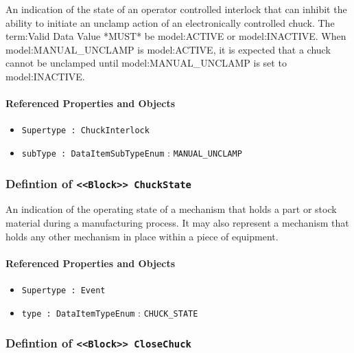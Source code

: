 \FloatBarrier

An indication of the state of an operator controlled interlock that can inhibit the ability to initiate an unclamp action of an electronically controlled chuck.
 The {term:Valid Data Value} *MUST* be {model:ACTIVE} or {model:INACTIVE}. 
 When {model:MANUAL_UNCLAMP} is {model:ACTIVE}, it is expected that a chuck cannot be unclamped until {model:MANUAL_UNCLAMP} is set to {model:INACTIVE}. 

\FloatBarrier
\paragraph{Referenced Properties and Objects}

\begin{itemize}
\item \texttt{Supertype : ChuckInterlock}

\item \texttt{subType : DataItemSubTypeEnum} : \texttt{MANUAL_UNCLAMP}

\end{itemize}
\FloatBarrier
\subsubsection{Defintion of \texttt{<<Block>> ChuckState}}
  \label{type:ChuckState}

\FloatBarrier

An indication of the operating state of a mechanism that holds a part or stock material during a manufacturing process. It may also represent a mechanism that holds any other mechanism in place within a piece of equipment.

\FloatBarrier
\paragraph{Referenced Properties and Objects}

\begin{itemize}
\item \texttt{Supertype : Event}

\item \texttt{type : DataItemTypeEnum} : \texttt{CHUCK_STATE}

\end{itemize}
\FloatBarrier
\subsubsection{Defintion of \texttt{<<Block>> CloseChuck}}
  \label{type:CloseChuck}

